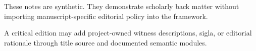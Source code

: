 \noindent These notes are synthetic. They demonstrate scholarly back matter without importing manuscript-specific editorial policy into the framework.

A critical edition may add project-owned witness descriptions, sigla, or editorial rationale through title source and documented semantic modules.
